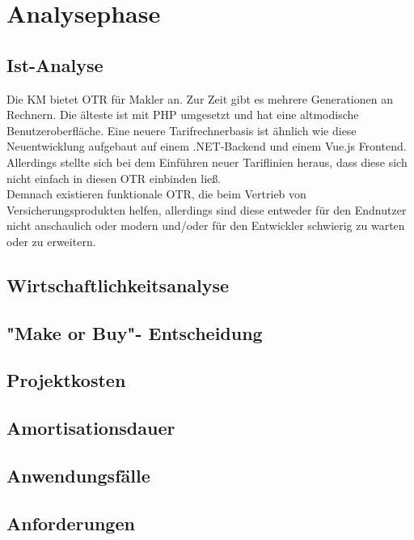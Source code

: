 \newpage
\section{Analysephase}
\label{analysephase}

\subsection{Ist-Analyse}
\label{ist}
\begin{comment}
evtl alte otrs mit nutzwertanalyse vergleichen?
\end{comment}
Die \ac{KM} bietet \ac{OTR} für Makler an. Zur Zeit gibt es mehrere Generationen an Rechnern. Die älteste ist mit PHP umgesetzt und hat eine altmodische Benutzeroberfläche. Eine neuere Tarifrechnerbasis ist ähnlich wie diese Neuentwicklung aufgebaut auf einem .NET-Backend und einem Vue.js Frontend. Allerdings stellte sich bei dem Einführen neuer Tariflinien heraus, dass diese sich nicht einfach in diesen \ac{OTR} einbinden ließ. \\
Demnach existieren funktionale \ac{OTR}, die beim Vertrieb von Versicherungsprodukten helfen, allerdings sind diese entweder für den Endnutzer nicht anschaulich oder modern und/oder für den Entwickler schwierig zu warten oder zu erweitern.

\subsection{Wirtschaftlichkeitsanalyse}
\label{wirtschaftlichkeitsanalyse}

\subsection{"Make or Buy"- Entscheidung}
\label{makeOrBuy}

\subsection{Projektkosten}
\label{projektkosten}

\subsection{Amortisationsdauer}
\label{amortisationsdauer}

\subsection{Anwendungsfälle}
\label{anwednungsfaelle}

\subsection{Anforderungen}
\label{anforderungen}


